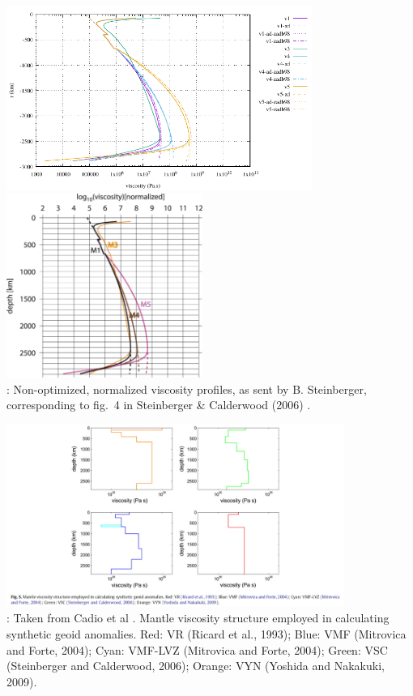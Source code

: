 \begin{center}
\includegraphics[height=6cm]{images/viscosity_profile/profiles_steinberger}
\includegraphics[height=6cm]{images/viscosity_profile/stca06-fig4}\\
{\captionfont \twothousandsix:
Non-optimized, normalized viscosity profiles, as sent by B. Steinberger,
corresponding to fig.~4 in Steinberger \& Calderwood (2006) \cite{stca06}.}
\end{center}


\begin{center}
\includegraphics[width=11cm]{images/viscosity_profile/capd11}\\
{\captionfont \twothousandeleven: Taken from Cadio et al \cite{capd11}.
Mantle viscosity structure employed in calculating synthetic geoid anomalies. 
Red: VR (Ricard et al., 1993); Blue: VMF (Mitrovica and Forte, 2004); Cyan: VMF-LVZ (Mitrovica
and Forte, 2004); Green: VSC (Steinberger and Calderwood, 2006); Orange: VYN (Yoshida and Nakakuki, 2009).}
\end{center}

